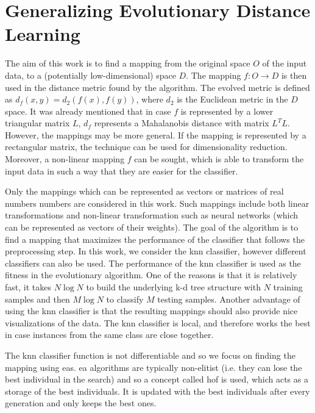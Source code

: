 \documentclass[12pt,a4paper]{report}
\begin{document}

\chapter{Generalizing Evolutionary Distance Learning} \label{chap:our-method}

The aim of this work is to find a mapping from the original space $O$ of the input data, to a (potentially low-dimensional) space $D$. The mapping $f: O \to D$ is then used in the distance metric found by the algorithm. The evolved metric is defined as $d_f(x, y) = d_2(f(x), f(y))$, where $d_2$ is the Euclidean metric in the $D$ space. It was already mentioned that in case $f$ is represented by a lower triangular matrix $L$, $d_f$ represents a Mahalanobis distance with matrix $L^TL$. However, the mappings may be more general. If the mapping is represented by a rectangular matrix, the technique can be used for dimensionality reduction. Moreover, a non-linear mapping $f$ can be sought, which is able to transform the input data in such a way that they are easier for the classifier.

Only the mappings which can be represented as vectors or matrices of real numbers numbers are considered in this work. Such mappings include both linear transformations and non-linear transformation such as neural networks (which can be represented as vectors of their weights). The goal of the algorithm is to find a mapping that maximizes the performance of the classifier that follows the preprocessing step. In this work, we consider the \ac{knn} classifier, however different classifiers can also be used. The performance of the \ac{knn} classifier is used as the fitness in the evolutionary algorithm. One of the reasons is that it is relatively fast, it takes $N\log{N}$ to build the underlying k-d tree structure with $N$ training samples and then $M \log{N}$ to classify $M$ testing samples. Another advantage of using the \ac{knn} classifier is that the resulting mappings should also provide nice visualizations of the data. The \ac{knn} classifier is local, and therefore works the best in case instances from the same class are close together.

The \ac{knn} classifier function is not differentiable and so we focus on finding the mapping using \aclp{ea}. \Ac{ea} algorithms are typically non-elitist (i.e. they can lose the best individual in the search) and so a concept called \acf{hof} is used, which acts as a storage of the best individuals. It is updated with the best individuals after every generation and only keeps the best ones.
\end{document}
